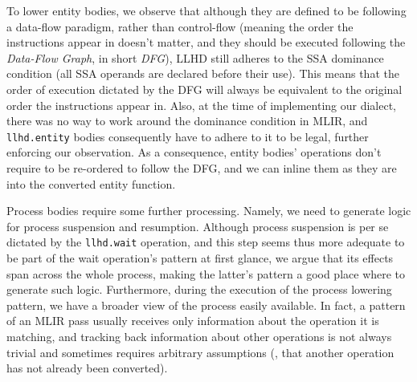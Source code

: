 To lower entity bodies, we observe that although they are defined to be following a data-flow paradigm, rather than control-flow (meaning the order the instructions appear in doesn't matter, and they should be executed following the \textit{Data-Flow Graph}, in short \textit{DFG}), LLHD still adheres to the SSA dominance condition (all SSA operands are declared before their use). This means that the order of execution dictated by the DFG will always be equivalent to the original order the instructions appear in. Also, at the time of implementing our dialect, there was no way to work around the dominance condition in MLIR, and \texttt{llhd.entity} bodies consequently have to adhere to it to be legal, further enforcing our observation. As a consequence, entity bodies' operations don't require to be re-ordered to follow the DFG, and we can inline them as they are into the converted entity function.

Process bodies require some further processing. Namely, we need to generate logic for process suspension and resumption. Although process suspension is per se dictated by the \texttt{llhd.wait} operation, and this step seems thus more adequate to be part of the wait operation's pattern at first glance, we argue that its effects span across the whole process, making the latter's pattern a good place where to generate such logic. Furthermore, during the execution of the process lowering pattern, we have a broader view of the process easily available. In fact, a pattern of an MLIR pass usually receives only information about the operation it is matching, and tracking back information about other operations is not always trivial and sometimes requires arbitrary assumptions (\eg, that another operation has not already been converted).

